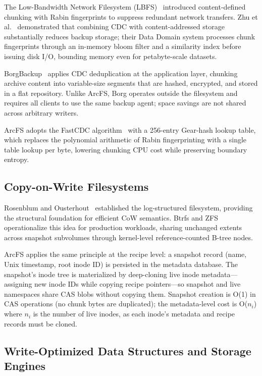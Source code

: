 \documentclass[5p,times]{elsarticle}
\begin{document}
The Low-Bandwidth Network Filesystem (LBFS)~\cite{muthitacharoen2001lbfs}
introduced content-defined chunking with Rabin fingerprints to suppress
redundant network transfers. Zhu et al.~\cite{zhu2008dedup} demonstrated
that combining CDC with content-addressed storage substantially reduces
backup storage; their Data Domain system processes chunk fingerprints
through an in-memory bloom filter and a similarity index before issuing
disk I/O, bounding memory even for petabyte-scale datasets.

BorgBackup~\cite{borgbackup2024} applies CDC deduplication at the
application layer, chunking archive content into variable-size segments
that are hashed, encrypted, and stored in a flat repository.  Unlike ArcFS,
Borg operates outside the filesystem and requires all clients to use the
same backup agent; space savings are not shared across arbitrary writers.

ArcFS adopts the FastCDC algorithm~\cite{xia2016fastcdc} with a 256-entry
Gear-hash lookup table, which replaces the polynomial arithmetic of Rabin
fingerprinting with a single table lookup per byte, lowering chunking CPU
cost while preserving boundary entropy.

\subsection{Copy-on-Write Filesystems}

Rosenblum and Ousterhout~\cite{rosenblum1992lfs} established the
log-structured filesystem, providing the structural foundation for efficient
CoW semantics. Btrfs and ZFS operationalize this idea for production
workloads, sharing unchanged extents across snapshot subvolumes through
kernel-level reference-counted B-tree nodes.

ArcFS applies the same principle at the recipe level: a snapshot record
(name, Unix timestamp, root inode ID) is persisted in the metadata database.
The snapshot's inode tree is materialized by deep-cloning live inode
metadata---assigning new inode IDs while copying recipe pointers---so
snapshot and live namespaces share CAS blobs without copying them.
Snapshot creation is O(1) in CAS operations (no chunk bytes are duplicated);
the metadata-level cost is O($n_i$) where $n_i$ is the number of live inodes,
as each inode's metadata and recipe records must be cloned.

\subsection{Write-Optimized Data Structures and Storage Engines}
\end{document}
